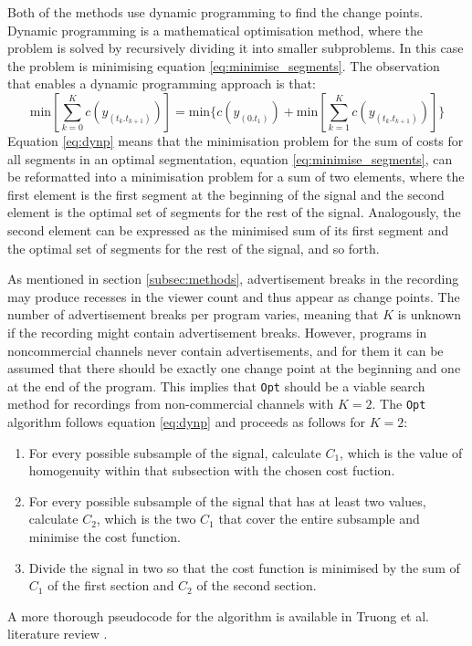 Both of the methods %
use dynamic programming to find the change points. Dynamic programming is a mathematical optimisation method, where the problem is solved by recursively dividing it into smaller subproblems. In this case the problem is minimising equation \ref{eq:minimise_segments}. The observation that enables a dynamic programming approach is that:
\begin{equation}
  \text{min} \left[ \sum_{k=0} ^{K}  c(y_{ (t_k . t_{k+1} )}) \right] = 
  \text{min}\Bigg\{
    c(y_{(0.t_1)}) + 
    \text{min} \left[ \sum_{k=1} ^{K}  c(y_{ (t_k . t_{k+1} )}) \right] 
  \Bigg\}
  \label{eq:dynp}
\end{equation}
Equation \ref{eq:dynp} means that
the minimisation problem for the sum of costs for all segments in an optimal segmentation, equation \ref{eq:minimise_segments},
can be reformatted into a minimisation problem for a sum of two elements,
where the first element is the first segment at the beginning of the signal
and the second element is the optimal set of segments for the rest of the signal.
Analogously, the second element can be expressed as the minimised sum of its first segment and the optimal set of segments for the rest of the signal, and so forth. 

As mentioned in section \ref{subsec:methods}, advertisement breaks in the recording may produce recesses in the viewer count and thus appear as change points. The number of advertisement breaks per program varies, meaning that $K$ is unknown if the recording might contain advertisement breaks. However, programs in noncommercial channels never contain advertisements, and for them it can be assumed that there should be exactly one change point at the beginning and one at the end of the program. This implies that \texttt{Opt} should be a viable search method for recordings from non-commercial channels with $K=2$.
The \texttt{Opt} algorithm follows equation \ref{eq:dynp} and proceeds as follows for $K = 2$: %
\begin{enumerate}
  \item For every possible subsample of the signal, calculate $C_1$, which is the value of homogenuity within that subsection with the chosen cost fuction.
  \item For every possible subsample of the signal that has at least two values, calculate $C_2$, which is the two $C_1$ that cover the entire subsample and minimise the cost function.
  \item Divide the signal in two so that the cost function is minimised by the sum of $C_1$ of the first section and $C_2$ of the second section. 
\end{enumerate}
A more thorough pseudocode for the algorithm is available in Truong et al. literature review \cite{truongSelectiveReviewOffline2020}.

